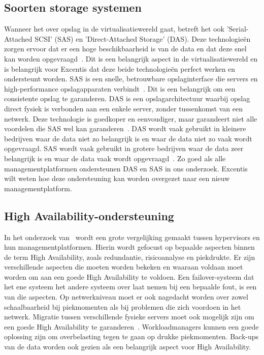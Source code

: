 \subsection{Soorten storage systemen}
Wanneer het over opslag in de virtualisatiewereld gaat, betreft het ook 'Serial-Attached SCSI' (SAS) en 'Direct-Attached Storage' (DAS). Deze technologieën zorgen ervoor dat er een hoge beschikbaarheid is van de data en dat deze snel kan worden opgevraagd~\autocite{griswold2002storage}. Dit is een belangrijk aspect in de virtualisatiewereld en is belangrijk voor Excentis dat deze beide technologieën perfect werken en ondersteunt worden.
SAS is een snelle, betrouwbare opslaginterface die servers en high-performance opslagapparaten verbindt~\autocite{aravindan2014performance}. Dit is een belangrijk om een consistente opslag te garanderen. DAS is een opslagarchitectuur waarbij opslag direct fysiek is verbonden aan een enkele server, zonder tussenkomst van een netwerk. Deze technologie is goedkoper en eenvoudiger, maar garandeert niet alle voordelen die SAS wel kan garanderen~\autocite{griswold2002storage}.
DAS wordt vaak gebruikt in kleinere bedrijven waar de data niet zo belangrijk is en waar de data niet zo vaak wordt opgevraagd. SAS wordt vaak gebruikt in grotere bedrijven waar de data zeer belangrijk is en waar de data vaak wordt opgevraagd~\autocite{griswold2002storage}.
Zo goed als alle managementplatformen ondersteunen DAS en SAS in ons onderzoek. Excentis wilt weten hoe deze ondersteuning kan worden overgezet naar een nieuw managementplatform.

\subsection{High Availability-ondersteuning}
In het onderzoek van~\textcite{dudnik2017creating} wordt een grote vergelijking gemaakt tussen hypervisors en hun managementplatformen. Hierin wordt gefocust op bepaalde aspecten binnen de term High Availability, zoals redundantie, risicoanalyse en piekdrukte.
Er zijn verschillende aspecten die moeten worden bekeken en waaraan voldaan moet worden om aan een goede High Availability te voldoen. Een failover-systeem dat het ene systeem het andere systeem over laat nemen bij een bepaalde fout, is een van die aspecten.
Op netwerkniveau moet er ook nagedacht worden over zowel schaalbaarheid bij piekmomenten als bij problemen die zich voordoen in het netwerk. Migratie tussen verschillende fysieke servers moet ook mogelijk zijn om een goede High Availability te garanderen~\autocite{dudnik2017creating}.
Workloadmanagers kunnen een goede oplossing zijn om overbelasting tegen te gaan op drukke piekmomenten. Back-ups van de data worden ook gezien als een belangrijk aspect voor High Availability.


